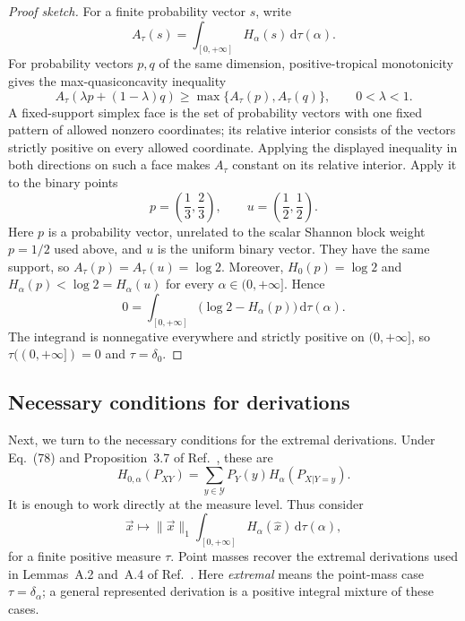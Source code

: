 \documentclass[aps,pra,11pt,onecolumn,nofootinbib,tightenlines]{revtex4-2}
\theoremstyle{definition}
\newcommand{\Y}{\mathcal{Y}}
\def\d{\mathrm{d}}
\newcommand{\ParameterMainDerivationLift}{Lemmas~A.2 and~A.4 of Ref.~\cite{rubboli2026complete}}
\newcommand{\ParameterMainDerivationRepresentation}{Eq.~(78) and Proposition~3.7 of Ref.~\cite{rubboli2026complete}}
\begin{document}
\begin{proof}[Proof sketch]
For a finite probability vector $s$, write
\begin{equation}
A_\tau(s)=\int_{[0,+\infty]}H_\alpha(s)\,\d\tau(\alpha).
\label{eq:concise-positive-tropical-integrated-entropy}
\end{equation}
For probability vectors $p,q$ of the same dimension, positive-tropical
monotonicity gives the max-quasiconcavity inequality
\begin{equation}
A_\tau(\lambda p+(1-\lambda)q)
\geq\max\{A_\tau(p),A_\tau(q)\},
\qquad 0<\lambda<1.
\label{eq:concise-strong-max-quasiconcavity}
\end{equation}
A fixed-support simplex face is the set of probability vectors with one fixed
pattern of allowed nonzero coordinates; its relative interior consists of
the vectors strictly positive on every allowed coordinate.  Applying the
displayed inequality in both directions on such a face makes $A_\tau$ constant
on its relative interior.  Apply it to the binary points
\[
p=\left(\frac13,\frac23\right),
\qquad
u=\left(\frac12,\frac12\right).
\]
Here $p$ is a probability vector, unrelated to the scalar Shannon block weight
$p=1/2$ used above, and $u$ is the uniform binary vector.
They have the same support, so $A_\tau(p)=A_\tau(u)=\log2$.  Moreover,
$H_0(p)=\log2$ and $H_\alpha(p)<\log2=H_\alpha(u)$ for every
$\alpha\in(0,+\infty]$.  Hence
\begin{equation}
0=\int_{[0,+\infty]}
\bigl(\log2-H_\alpha(p)\bigr)\,\d\tau(\alpha).
\label{eq:concise-positive-tropical-zero-gap}
\end{equation}
The integrand is nonnegative everywhere and strictly positive on
$(0,+\infty]$, so $\tau((0,+\infty])=0$ and $\tau=\delta_0$.
\end{proof}

\subsection{Necessary conditions for derivations}
\label{sec:necessary-derivations}

Next, we turn to the necessary conditions for the extremal derivations.  Under
\ParameterMainDerivationRepresentation, these are
\begin{equation}
H_{0,\alpha}(P_{XY})=
\sum_{y\in\Y}P_Y(y)H_\alpha(P_{X|Y=y}).
\end{equation}
It is enough to work directly at the measure level.  Thus consider
\begin{equation}
\vec{x}\longmapsto\|\vec{x}\|_1
\int_{[0,+\infty]}H_\alpha(\hat{x})\,\d\tau(\alpha),
\end{equation}
for a finite positive measure $\tau$.  Point masses recover the extremal
derivations used in \ParameterMainDerivationLift.
Here \emph{extremal} means the point-mass case $\tau=\delta_\alpha$; a general
represented derivation is a positive integral mixture of these cases.
\end{document}
